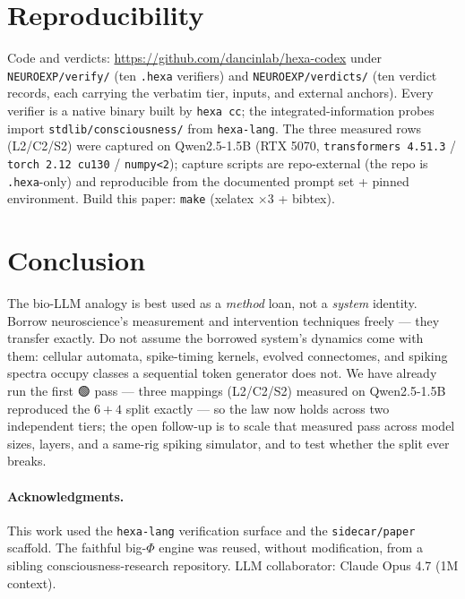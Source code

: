 \documentclass[11pt,a4paper]{article}
\providecommand{\tierGreen}{🟢}
\begin{document}
\section{Reproducibility}
\label{sec:repro}

Code and verdicts: \url{https://github.com/dancinlab/hexa-codex} under
\texttt{NEUROEXP/verify/} (ten \texttt{.hexa} verifiers) and
\texttt{NEUROEXP/verdicts/} (ten verdict records, each carrying the
verbatim tier, inputs, and external anchors). Every verifier is a native
binary built by \texttt{hexa cc}; the integrated-information probes
import \texttt{stdlib/consciousness/} from \texttt{hexa-lang}. The three
measured rows (L2/C2/S2) were captured on Qwen2.5-1.5B (RTX 5070,
\texttt{transformers 4.51.3} / \texttt{torch 2.12 cu130} / \texttt{numpy<2});
capture scripts are repo-external (the repo is \texttt{.hexa}-only) and
reproducible from the documented prompt set + pinned environment. Build
this paper: \texttt{make} (xelatex $\times 3$ + bibtex).

\section{Conclusion}
\label{sec:conclusion}

The bio-LLM analogy is best used as a \emph{method} loan, not a
\emph{system} identity. Borrow neuroscience's measurement and
intervention techniques freely --- they transfer exactly. Do not assume
the borrowed system's dynamics come with them: cellular automata,
spike-timing kernels, evolved connectomes, and spiking spectra occupy
classes a sequential token generator does not. We have already run the
first $\tierGreen$ pass --- three mappings (L2/C2/S2) measured on
Qwen2.5-1.5B reproduced the $6{+}4$ split exactly --- so the law now
holds across two independent tiers; the open follow-up is to scale that
measured pass across model sizes, layers, and a same-rig spiking
simulator, and to test whether the split ever breaks.

\paragraph{Acknowledgments.}
This work used the \texttt{hexa-lang} verification surface and the
\texttt{sidecar/paper} scaffold. The faithful big-$\Phi$ engine was
reused, without modification, from a sibling consciousness-research
repository. LLM collaborator: Claude Opus 4.7 (1M context).



\end{document}
